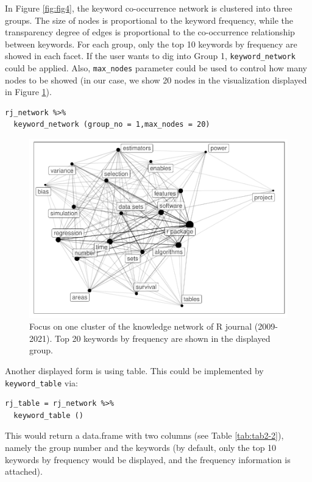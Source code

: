In Figure \ref{fig:fig4}, the keyword co-occurrence network is clustered into three groups. The size of nodes is proportional to the keyword frequency, while the transparency degree of edges is proportional to the co-occurrence relationship between keywords. For each group, only the top 10 keywords by frequency are showed in each facet. If the user wants to dig into Group 1, \texttt{keyword\_network} could be applied. Also, \texttt{max\_nodes} parameter could be used to control how many nodes to be showed (in our case, we show 20 nodes in the visualization displayed in Figure \ref{fig:fig5}).

\begin{verbatim}
rj_network %>% 
  keyword_network (group_no = 1,max_nodes = 20) 
\end{verbatim}

\begin{figure}

{\centering \includegraphics[width=1\linewidth]{akc_files/figure-latex/fig5-1} 

}

\caption{Focus on one cluster of the knowledge network of R journal (2009-2021). Top 20 keywords by frequency are shown in the displayed group.}\label{fig:fig5}
\end{figure}

Another displayed form is using table. This could be implemented by \texttt{keyword\_table} via:

\begin{verbatim}
rj_table = rj_network %>% 
  keyword_table () 
\end{verbatim}

This would return a data.frame with two columns (see Table \ref{tab:tab2-2}), namely the group number and the keywords (by default, only the top 10 keywords by frequency would be displayed, and the frequency information is attached).

